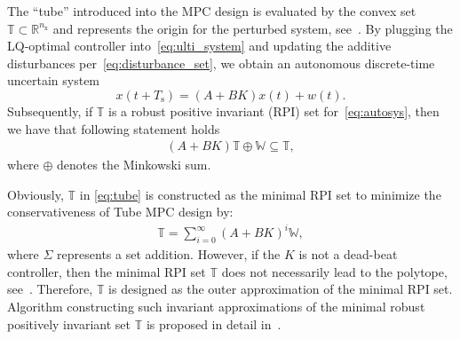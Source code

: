 \documentclass[letterpaper, 10 pt, conference]{ieeeconf}
\begin{document}
The ``tube'' introduced into the MPC design is evaluated by the convex set $\mathbb{T} \subset \mathbb{R}^{n_{\mathrm{x}}}$ and represents the origin for the perturbed system, see~\cite{MS05}. 
%
By plugging the LQ-optimal controller into~\eqref{eq:ulti_system} and updating the additive disturbances per~\eqref{eq:disturbance_set}, we obtain an autonomous discrete-time uncertain system 
\begin{equation}
	\label{eq:autosys}
	x(t+T_{\mathrm{s}}) = (A + BK)x(t) + w(t).
\end{equation}
Subsequently, if $\mathbb{T}$ is a robust positive invariant (RPI) set for~\eqref{eq:autosys}, then we have that following statement holds 
\begin{eqnarray}
	\label{eq:tube}
	\left( A + B K \right) \mathbb{T} \oplus \mathbb{W} \subseteq \mathbb{T},
\end{eqnarray}
where $\oplus$ denotes the Minkowski sum.

Obviously, $\mathbb{T}$ in \eqref{eq:tube} is constructed as the minimal RPI set to minimize the conservativeness of Tube MPC design by:
\begin{eqnarray}
	\label{eq:tube_design}
	\mathbb{T} = \sum_{i=0}^{\infty} \left( A + B K \right)^{i} \mathbb{W},
\end{eqnarray}
where $\Sigma$ represents a set addition. However, if the $K$ is not a dead-beat controller, then the minimal RPI set $\mathbb{T}$ does not necessarily lead to the polytope, see~\cite{MS05}. Therefore, $\mathbb{T}$ is designed as the outer approximation of the minimal RPI set.  Algorithm constructing such invariant approximations of the minimal robust positively invariant set $\mathbb{T}$ is proposed in detail in~\cite{RK05}.
\end{document}
